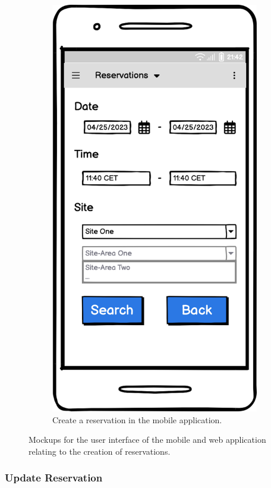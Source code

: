 \begin{figure}[h]
\begin{subfigure}[c]{0.3\textwidth}
        \includegraphics[width=\textwidth,height=1.6\textwidth,keepaspectratio]{resources/images/main/5_design/mockups/create_reservation/mobile/Create_Reservation.png}
        \caption{Create a reservation in the mobile application.}
        \label{fig:mobile-create-reservation}
    \end{subfigure}
    \caption{Mockups for the user interface of the mobile and web application relating to the creation of reservations.}
    \label{fig:mockups-create-reservation}
\end{figure}

\subsubsection{Update Reservation}
\label{ch:Design:sec:Reservation System:ssec:Management Capabilities:sssec:Update Reservation}

